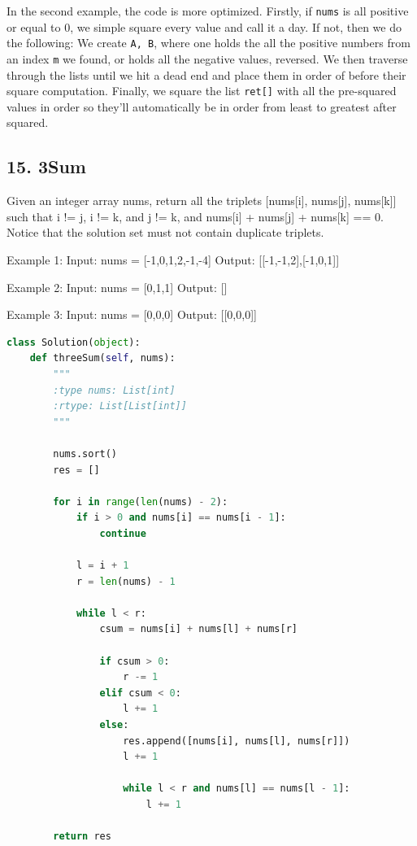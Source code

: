\documentclass[11pt]{article}
\begin{document}
\noindent In the second example, the code is more optimized. Firstly, if \texttt{nums} is all positive or equal to 0, we simple square every value and call it a day.
\noindent If not, then we do the following: We create \texttt{A, B}, where one holds the all the positive numbers from an index \texttt{m} we found, or holds all the negative values, reversed. We then traverse through the lists until we hit a dead end and place them in order of before their square computation. Finally, we square the list \texttt{ret[]} with all the pre-squared values in order so they'll automatically be in order from least to greatest after squared.



\subsection*{15. 3Sum}
Given an integer array nums, return all the triplets [nums[i], nums[j], nums[k]] such that i != j, i != k, and j != k, and nums[i] + nums[j] + nums[k] == 0.
Notice that the solution set must not contain duplicate triplets.

 

Example 1:
Input: nums = [-1,0,1,2,-1,-4]
Output: [[-1,-1,2],[-1,0,1]]

Example 2:
Input: nums = [0,1,1]
Output: []

Example 3:
Input: nums = [0,0,0]
Output: [[0,0,0]]

\begin{lstlisting}[language=python, mathescape=true]
class Solution(object):
    def threeSum(self, nums):
        """
        :type nums: List[int]
        :rtype: List[List[int]]
        """
        
        nums.sort()
        res = []
        
        for i in range(len(nums) - 2):
            if i > 0 and nums[i] == nums[i - 1]:
                continue
                
            l = i + 1
            r = len(nums) - 1
            
            while l < r:
                csum = nums[i] + nums[l] + nums[r]
                
                if csum > 0:
                    r -= 1
                elif csum < 0:
                    l += 1
                else:
                    res.append([nums[i], nums[l], nums[r]])
                    l += 1
                    
                    while l < r and nums[l] == nums[l - 1]:
                        l += 1
                        
        return res
\end{lstlisting}
\end{document}
